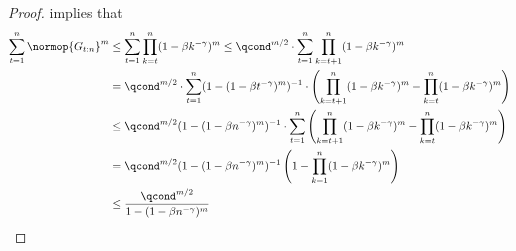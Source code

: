 \begin{proof}
 implies that
\begin{align} 
        \sum_{t=1}^n \normop{G_{t:n}}^m &\leq \sum_{t=1}^n \prod_{k=t}^n (1 - \beta k^{-\gamma})^m \leq \qcond^{m/2} \cdot \sum_{t=1}^n \prod_{k=t+1}^n (1 - \beta k^{-\gamma})^m \\ &= \qcond^{m/2} \cdot \sum_{t=1}^n (1 - (1 - \beta t^{-\gamma})^m)^{-1} \cdot \left( \prod_{k=t+1}^n (1 - \beta k^{-\gamma})^m - \prod_{k=t}^n (1 - \beta k^{-\gamma})^m \right) \\ &\leq \qcond^{m/2} (1 - (1 - \beta n^{-\gamma})^m)^{-1} \cdot \sum_{t=1}^n \left( \prod_{k=t+1}^n (1 - \beta k^{-\gamma})^m - \prod_{k=t}^n (1 - \beta k^{-\gamma})^m \right)\\ &= 
        \qcond^{m/2} (1 - (1 - \beta n^{-\gamma})^m)^{-1} \left(1 -  \prod_{k=1}^n (1 - \beta k^{-\gamma})^m \right) \\ &\leq \frac{\qcond^{m/2}}{1 - (1 - \beta n^{-\gamma})^m}
    \end{align}
\end{proof}

